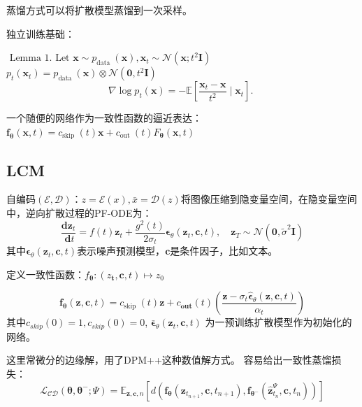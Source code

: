 蒸馏方式可以将扩散模型蒸馏到一次采样。

独立训练基础：

$\text { Lemma 1. Let } \mathbf{x} \sim p_{\text {data }}(\mathbf{x}), \mathbf{x}_t \sim \mathcal{N}\left(\mathbf{x} ; t^2 \boldsymbol{I}\right)$   $p_t\left(\mathbf{x}_t\right)=p_{\text {data }}(\mathbf{x}) \otimes \mathcal{N}\left(\mathbf{0}, t^2 \boldsymbol{I}\right) $ 
\begin{equation}
  \nabla \log p_t(\mathbf{x})=-\mathbb{E}\left[\frac{\mathbf{x}_t-\mathbf{x}}{t^2} \mid \mathbf{x}_t\right] \text {. }
\end{equation}

一个随便的网络作为一致性函数的逼近表达：
$\boldsymbol{f}_{\boldsymbol{\theta}}(\mathbf{x}, t)=c_{\text {skip }}(t) \mathbf{x}+c_{\text {out }}(t) F_{\boldsymbol{\theta}}(\mathbf{x}, t)$

\subsection{LCM}
自编码$(\mathcal{E}, \mathcal{D})$：$z=\mathcal{E}(x), \bar{x}=\mathcal{D}(z)$将图像压缩到隐变量空间，在隐变量空间中，逆向扩散过程的PF-ODE为：
\begin{equation}
\frac{\mathbf{d} \boldsymbol{z}_t}{\mathbf{~d} t}=f(t) \boldsymbol{z}_t+\frac{g^2(t)}{2 \sigma_t} \boldsymbol{\epsilon}_\theta\left(\boldsymbol{z}_t, \boldsymbol{c}, t\right), \quad \boldsymbol{z}_T \sim \mathcal{N}\left(\mathbf{0}, \tilde{\sigma}^2 \boldsymbol{I}\right)
\end{equation}
其中$\boldsymbol{\epsilon}_\theta\left(\boldsymbol{z}_t, \boldsymbol{c}, t\right)$表示噪声预测模型，$\boldsymbol{c}$是条件因子，比如文本。

定义一致性函数：$f_{\boldsymbol{\theta}}:\left(z_{\boldsymbol{t}}, \boldsymbol{c}, t\right) \mapsto z_0$

\begin{equation}
\boldsymbol{f}_{\boldsymbol{\theta}}(\boldsymbol{z}, \boldsymbol{c}, t)=c_{\text {skip }}(t) \boldsymbol{z}+c_{\mathbf{out}}(t)\left(\frac{\boldsymbol{z}-\sigma_t \hat{\boldsymbol{\epsilon}}_\theta(\boldsymbol{z}, \boldsymbol{c}, t)}{\alpha_t}\right)
\end{equation}
其中$c_{skip}(0)=1, c_{skip}(0)=0$, $\boldsymbol{\bar{\epsilon}}_\theta\left(\boldsymbol{z}_t, \boldsymbol{c}, t\right)$ 为一预训练扩散模型作为初始化的网络。

这里常微分的边缘解，用了DPM++这种数值解方式。
容易给出一致性蒸馏损失：
\begin{equation}
\mathcal{L}_{\mathcal{C D}}\left(\boldsymbol{\theta}, \boldsymbol{\theta}^{-} ; \Psi\right)=\mathbb{E}_{\boldsymbol{z}, \boldsymbol{c}, n}\left[d\left(\boldsymbol{f}_{\boldsymbol{\theta}}\left(\boldsymbol{z}_{t_{n+1}}, \boldsymbol{c}, t_{n+1}\right), \boldsymbol{f}_{\boldsymbol{\theta}^{-}}\left(\hat{\boldsymbol{z}}_{t_n}^{\Psi}, \boldsymbol{c}, t_n\right)\right)\right]
\end{equation}

